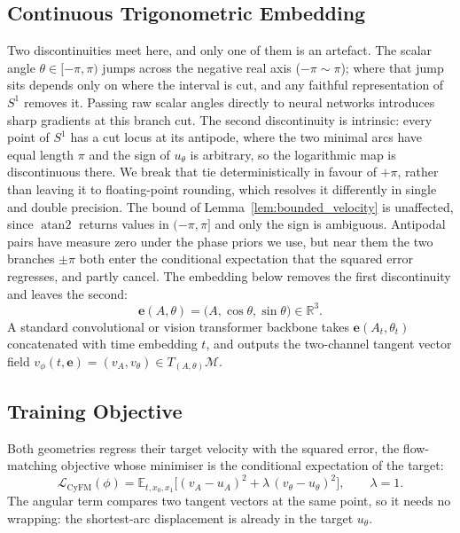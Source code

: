 \subsection{Continuous Trigonometric Embedding}
Two discontinuities meet here, and only one of them is an artefact. The scalar angle $\theta \in [-\pi, \pi)$ jumps across the negative real axis ($-\pi \sim \pi$); where that jump sits depends only on where the interval is cut, and any faithful representation of $S^1$ removes it. Passing raw scalar angles directly to neural networks introduces sharp gradients at this branch cut. The second discontinuity is intrinsic: every point of $S^1$ has a cut locus at its antipode, where the two minimal arcs have equal length $\pi$ and the sign of $u_\theta$ is arbitrary, so the logarithmic map is discontinuous there. We break that tie deterministically in favour of $+\pi$, rather than leaving it to floating-point rounding, which resolves it differently in single and double precision. The bound of Lemma~\ref{lem:bounded_velocity} is unaffected, since $\operatorname{atan2}$ returns values in $(-\pi, \pi]$ and only the sign is ambiguous. Antipodal pairs have measure zero under the phase priors we use, but near them the two branches $\pm\pi$ both enter the conditional expectation that the squared error regresses, and partly cancel. The embedding below removes the first discontinuity and leaves the second:
\begin{equation}
    \mathbf{e}(A, \theta) = \big(A, \cos\theta, \sin\theta\big) \in \mathbb{R}^3.
\end{equation}
A standard convolutional or vision transformer backbone takes $\mathbf{e}(A_t, \theta_t)$ concatenated with time embedding $t$, and outputs the two-channel tangent vector field $v_\phi(t, \mathbf{e}) = (v_A, v_\theta) \in T_{(A, \theta)}\mathcal{M}$.

\subsection{Training Objective}
Both geometries regress their target velocity with the squared error, the flow-matching objective whose minimiser is the conditional expectation of the target:
\begin{equation}
    \label{eq:loss}
    \mathcal{L}_{\mathrm{CyFM}}(\phi) = \mathbb{E}_{t, x_0, x_1} \Big[ (v_A - u_A)^2 + \lambda \, (v_\theta - u_\theta)^2 \Big], \qquad \lambda = 1.
\end{equation}
The angular term compares two tangent vectors at the same point, so it needs no wrapping: the shortest-arc displacement is already in the target $u_\theta$.

